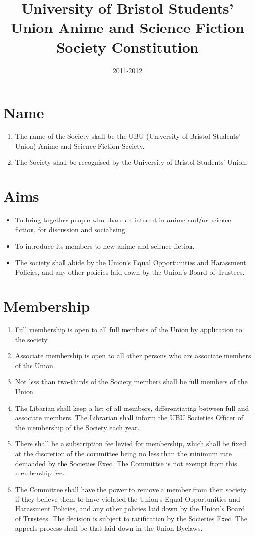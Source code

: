 \documentclass[a4paper,10pt]{article}
\title{University of Bristol Students’ Union Anime and Science Fiction Society Constitution}
\date{2011-2012}
\begin{document}
\maketitle
\section{Name}
\begin{enumerate}
  \item The name of the Society shall be the UBU (University of Bristol Students’ Union) Anime and Science Fiction Society.
  \item The Society shall be recognised by the University of Bristol Students’ Union.
\end{enumerate}

\section{Aims}
\begin{itemize}
  \item To bring together people who share an interest in anime and/or science fiction, for discussion and socialising.
  \item To introduce its members to new anime and science fiction.
  \item The society shall abide by the Union’s Equal Opportunities and Harassment Policies, and any other policies laid down by the Union’s Board of Trustees.
\end{itemize}


\section{Membership}
\begin{enumerate}
  \item Full membership is open to all full members of the Union by application to the society.
  \item Associate membership is open to all other persons who are associate members of the Union.
  \item Not less than two-thirds of the Society members shall be full members of the Union.
  \item The Libarian shall keep a list of all members, differentiating between full and associate members. The Librarian shall inform the UBU Societies Officer of the membership of the Society each year.
  \item There shall be a subscription fee levied for membership, which shall be fixed at the discretion of the committee being no less than the minimum rate demanded by the Societies Exec. The Committee is not exempt from this membership fee.
  \item The Committee shall have the power to remove a member from their society if they believe them to have violated the Union’s Equal Opportunities and Harassment Policies, and any other policies laid down by the Union’s Board of Trustees. The decision is subject to ratification by the Societies Exec. The appeals process shall be that laid down in the Union Byelaws.
\end{enumerate}
\end{document}
